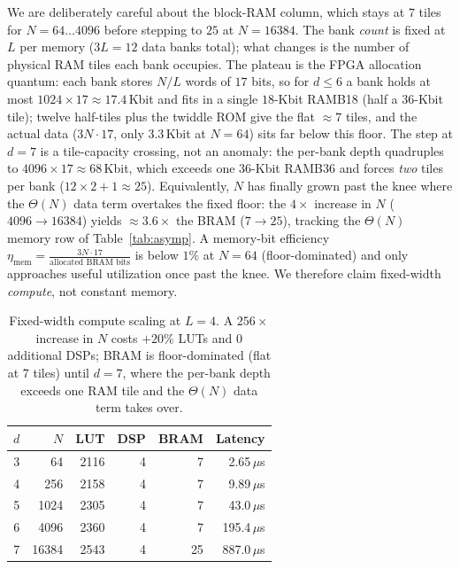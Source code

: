 \documentclass[conference]{IEEEtran}
\begin{document}
We are deliberately careful about the block-RAM column, which stays at $7$ tiles
for $N=64\ldots4096$ before stepping to $25$ at $N=16384$. The bank \emph{count}
is fixed at $L$ per memory ($3L=12$ data banks total); what changes is the number
of physical RAM tiles each bank occupies. The plateau is the FPGA allocation
quantum: each bank stores $N/L$ words of $17$ bits, so for $d\le 6$ a bank holds
at most $1024\times17\approx17.4$\,Kbit and fits in a single $18$-Kbit RAMB18
(half a $36$-Kbit tile); twelve half-tiles plus the twiddle ROM give the flat
$\approx7$ tiles, and the actual data ($3N\cdot17$, only $3.3$\,Kbit at $N=64$)
sits far below this floor. The step at $d=7$ is a tile-capacity crossing, not an
anomaly: the per-bank depth quadruples to $4096\times17\approx68$\,Kbit, which
exceeds one $36$-Kbit RAMB36 and forces \emph{two} tiles per bank
($12\times2+1\approx25$). Equivalently, $N$ has finally grown past the knee where
the $\Theta(N)$ data term overtakes the fixed floor: the $4\times$ increase in
$N$ ($4096\to16384$) yields $\approx3.6\times$ the BRAM ($7\to25$), tracking the
$\Theta(N)$ memory row of Table~\ref{tab:asymp}. A memory-bit efficiency
$\eta_{\mathrm{mem}}=\tfrac{3N\cdot17}{\text{allocated BRAM bits}}$ is below
$1\%$ at $N=64$ (floor-dominated) and only approaches useful utilization once
past the knee. We therefore claim fixed-width \emph{compute}, not constant
memory.

\begin{table}[t]
\centering
\caption{Fixed-width compute scaling at $L=4$. A $256\times$ increase in $N$
costs $+20\%$ LUTs and $0$ additional DSPs; BRAM is floor-dominated (flat at $7$
tiles) until $d=7$, where the per-bank depth exceeds one RAM tile and the
$\Theta(N)$ data term takes over.}
\label{tab:l4}
\footnotesize
\begin{tabular}{rrrrrr}
\toprule
$d$ & $N$ & LUT & DSP & BRAM & Latency\\
\midrule
3 & \num{64}    & \num{2116} & 4 & 7  & 2.65\,$\mu$s\\
4 & \num{256}   & \num{2158} & 4 & 7  & 9.89\,$\mu$s\\
5 & \num{1024}  & \num{2305} & 4 & 7  & 43.0\,$\mu$s\\
6 & \num{4096}  & \num{2360} & 4 & 7  & 195.4\,$\mu$s\\
7 & \num{16384} & \num{2543} & 4 & 25 & 887.0\,$\mu$s\\
\bottomrule
\end{tabular}
\end{table}
\end{document}
